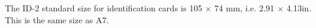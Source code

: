 The ID-2 standard size for identification cards is 105 \ensuremath{ \times } 74 mm, i.e. 
2.91 \ensuremath{ \times } 4.13in. This is the same size as A7.